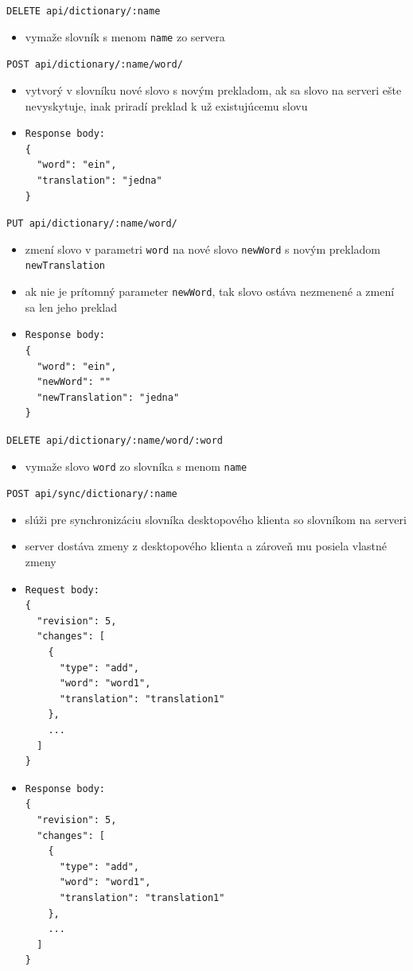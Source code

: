 \documentclass[
  digital, %
  table,   %
  lof,     %
  lot,     %
]{fithesis3}
\begin{document}
\noindent
\texttt{DELETE api/dictionary/:name}
\begin{itemize}
\item vymaže slovník s menom \texttt{name} zo servera
\end{itemize}

\noindent
\texttt{POST api/dictionary/:name/word/}
\begin{itemize}
\item vytvorý v slovníku nové slovo s novým prekladom, ak sa slovo na serveri ešte nevyskytuje, inak priradí preklad k už existujúcemu slovu 
\item \begin{lstlisting}[basicstyle=\small]
Response body:
{
  "word": "ein",
  "translation": "jedna"
}
\end{lstlisting}
\end{itemize}

\noindent
\texttt{PUT api/dictionary/:name/word/}
\begin{itemize}
\item zmení slovo v parametri \texttt{word} na nové slovo \texttt{newWord} s novým prekladom \texttt{newTranslation}
\item ak nie je prítomný parameter \texttt{newWord}, tak slovo ostáva nezmenené a zmení sa len jeho preklad
\item \begin{lstlisting}[basicstyle=\small]
Response body:
{
  "word": "ein",
  "newWord": ""
  "newTranslation": "jedna"
}
\end{lstlisting}
\end{itemize}

\noindent
\texttt{DELETE api/dictionary/:name/word/:word}
\begin{itemize}
\item vymaže slovo \texttt{word} zo slovníka s menom \texttt{name}
\end{itemize}

\noindent
\texttt{POST api/sync/dictionary/:name}
\begin{itemize}
\item slúži pre synchronizáciu slovníka desktopového klienta so slovníkom na serveri
\item server dostáva zmeny z desktopového klienta a zároveň mu posiela vlastné zmeny
\item \begin{lstlisting}[basicstyle=\small]
Request body:
{
  "revision": 5,
  "changes": [
    {
      "type": "add",
      "word": "word1",
      "translation": "translation1"
    },
    ...
  ]
}
\end{lstlisting}
\item \begin{lstlisting}[basicstyle=\small]
Response body:
{
  "revision": 5,
  "changes": [
    {
      "type": "add",
      "word": "word1",
      "translation": "translation1"
    },
    ...
  ]
}
\end{lstlisting}
\end{itemize}
\end{document}
